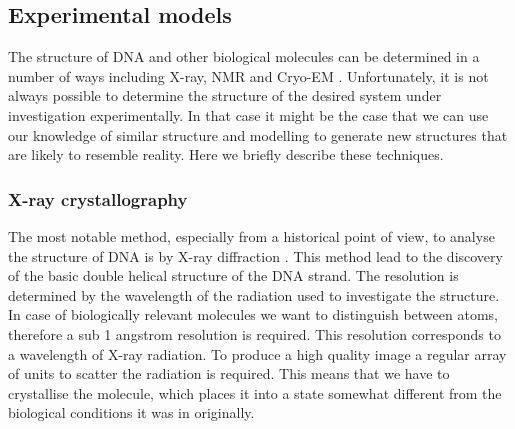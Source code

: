 \subsection{Experimental models}

The structure of DNA and other biological molecules can be determined in a number of ways including X-ray, NMR and Cryo-EM \cite{arnott1973refinement}. Unfortunately, it is not always possible to determine the structure of the desired system under investigation experimentally. In that case it might be the case that we can use our knowledge of similar structure and modelling to generate new structures that are likely to resemble reality. Here we briefly describe these techniques.

\subsubsection{X-ray crystallography}

The most notable method, especially from a historical point of view, to analyse the structure of DNA is by X-ray diffraction \cite{branden1999introduction}. This method lead to the discovery of the basic double helical structure of the DNA strand. The resolution is determined by the wavelength of the radiation used to investigate the structure. In case of biologically relevant molecules we want to distinguish between atoms, therefore a sub 1 angstrom resolution is required. This resolution corresponds to a wavelength of X-ray radiation. To produce a high quality image a regular array of units to scatter the radiation is required. This means that we have to crystallise the molecule, which places it into a state somewhat different from the biological conditions it was in originally.

